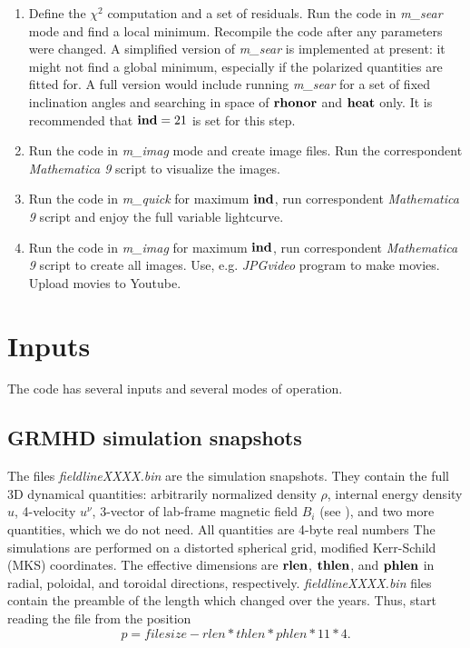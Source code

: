 \documentclass{emulateapj}
\newcommand{\mat}{\textit{Mathematica 9 }}
\begin{document}
\begin{enumerate}
{  in order to produce a spectrum, which resembles the observed
  spectrum.}
\item{Define the $\chi^2$ computation and a set of residuals.  Run the
  code in \textit{m\_sear} mode and find a local minimum. Recompile
  the code after any parameters were changed.  A simplified version of
  \textit{m\_sear} is implemented at present: it might not find a
  global minimum, especially if the polarized quantities are fitted
  for.  A full version would include running \textit{m\_sear} for a
  set of fixed inclination angles and searching in space of $\bf
  rhonor$ and $\bf heat$ only.  It is recommended that ${\bf ind}=21$
  is set for this step.}
\item{Run the code in \textit{m\_imag} mode and create image
  files. Run the correspondent \mat script to visualize the images.}
\item{Run the code in \textit{m\_quick} for maximum $\bf ind$, run
  correspondent \mat script and enjoy the full variable lightcurve.}
\item{Run the code in \textit{m\_imag} for maximum $\bf ind$, run
  correspondent \mat script to create all images. Use,
  e.g. \textit{JPGvideo} program to make movies.  Upload movies to
  Youtube.}
\end{enumerate}

\section{Inputs}
The code has several inputs and several modes of operation.
\subsection{GRMHD simulation snapshots}
The files \textit{fieldlineXXXX.bin} are the simulation snapshots. They contain the full 3D dynamical quantities: arbitrarily normalized density $\rho$, internal energy density $u$,
4-velocity $u^\nu$, 3-vector of lab-frame magnetic field $B_i$ (see \citealt{Penna:2010dj}), and two more quantities, which we do not need. All quantities are 4-byte real numbers
The simulations are performed on a distorted spherical grid, modified Kerr-Schild (MKS) coordinates. The effective dimensions are ${\bf rlen}$, ${\bf thlen}$, and ${\bf phlen}$
in radial, poloidal, and toroidal directions, respectively. \textit{fieldlineXXXX.bin} files contain the preamble of the length which changed over the years.
Thus, start reading the file from the position
\begin{equation}
p=filesize-rlen*thlen*phlen*11*4.
\end{equation}
\end{document}
